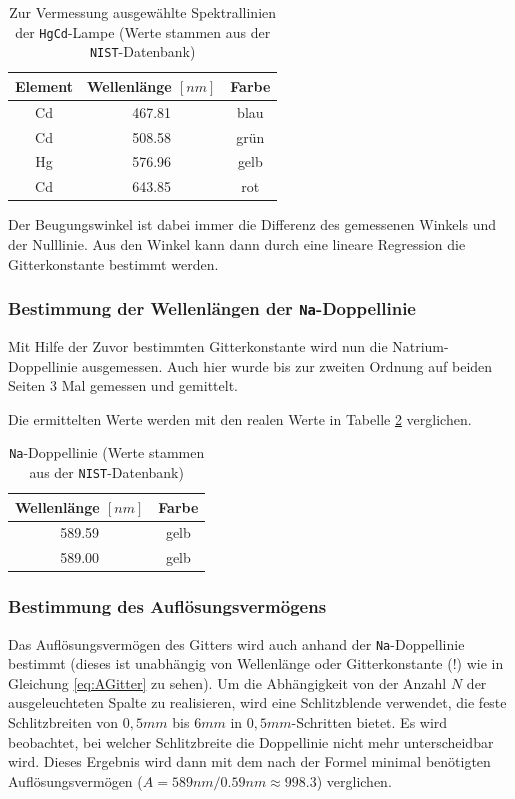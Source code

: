 \documentclass[a4paper, 11pt]{article}
\begin{document}
\begin{table}[H]
\large
\centering
	\begin{tabular}{|c|c|c|}
	\hline
	Element & Wellenlänge $[nm]$ & Farbe \\
	\hline
	Cd & 467.81 & blau \\
	\hline
	Cd & 508.58 & grün \\
	\hline
	Hg & 576.96 & gelb \\
	\hline
	Cd & 643.85 & rot \\
	\hline
	\end{tabular}
\caption{Zur Vermessung ausgewählte Spektrallinien der \texttt{HgCd}-Lampe (Werte stammen aus der \texttt{NIST}-Datenbank)}
\label{table:SpektrumHgCd}
\end{table}

Der Beugungswinkel ist dabei immer die Differenz des gemessenen Winkels und der Nulllinie. Aus den Winkel kann dann durch eine lineare Regression die Gitterkonstante bestimmt werden.

\subsubsection{Bestimmung der Wellenlängen der \texttt{Na}-Doppellinie}
Mit Hilfe der Zuvor bestimmten Gitterkonstante wird nun die Natrium-Doppellinie ausgemessen. Auch hier wurde bis zur zweiten Ordnung auf beiden Seiten 3 Mal gemessen und gemittelt.


Die ermittelten Werte werden mit den realen Werte in Tabelle \ref{table:SpektrumNa} verglichen.

\begin{table}[H]
	\large
	\centering
	\begin{tabular}{|c|c|}
		\hline
		Wellenlänge $[nm]$ & Farbe \\
		\hline
		589.59 & gelb \\
		\hline
		589.00 & gelb \\
		\hline
	\end{tabular}
	\caption{\texttt{Na}-Doppellinie (Werte stammen aus der \texttt{NIST}-Datenbank)}
	\label{table:SpektrumNa}
\end{table}

\subsubsection{Bestimmung des Auflösungsvermögens}
Das Auflösungsvermögen des Gitters wird auch anhand der \texttt{Na}-Doppellinie bestimmt (dieses ist unabhängig von Wellenlänge oder Gitterkonstante (!) wie in Gleichung \ref{eq:AGitter} zu sehen).
Um die Abhängigkeit von der Anzahl $N$ der ausgeleuchteten Spalte zu realisieren, wird eine Schlitzblende verwendet, die feste Schlitzbreiten von $0,5mm$ bis $6mm$ in $0,5mm$-Schritten bietet. Es wird beobachtet, bei welcher Schlitzbreite die Doppellinie nicht mehr unterscheidbar wird. Dieses Ergebnis wird dann mit dem nach der Formel minimal benötigten Auflösungsvermögen ($A=589nm/0.59nm\approx998.3$) verglichen.
\end{document}
